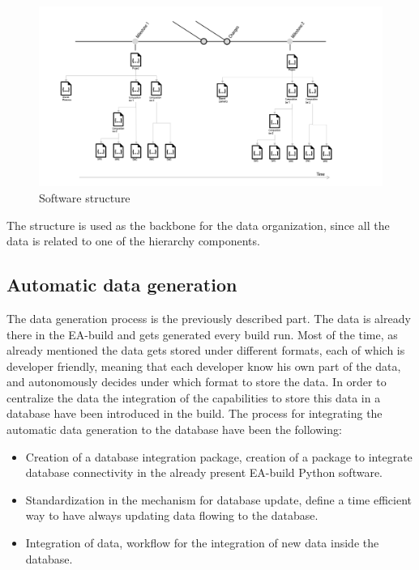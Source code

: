 \documentclass[../main.tex]{subfiles}
\begin{document}
\begin{figure}
    \centering
    \includegraphics[width=\linewidth]{images_folder/softwarestrucutre.png}
    \caption{Software structure}
    \label{fig:SWsTR}
\end{figure}
The structure is used as the backbone for the data organization, since all the data is related to one of the hierarchy components.
\subsection{Automatic data generation}
The data generation process is the previously described part. The data is already there in the EA-build and gets generated every build run. Most of the time, as already mentioned the data gets stored under different formats, each of which is developer friendly, meaning that each developer know his own part of the data, and autonomously decides under which format to store the data. 
In order to centralize the data the integration of the capabilities to store this data in a database have been introduced in the build. The process for integrating the automatic data generation to the database have been the following:
\begin{itemize}
    \item Creation of a database integration package, creation of a package to integrate database connectivity in the already present EA-build Python software.
    \item Standardization in the mechanism for database update, define a time efficient way to have always updating data flowing to the database. 
    \item Integration of data, workflow for the integration of new data inside the database.
\end{itemize}
\end{document}
